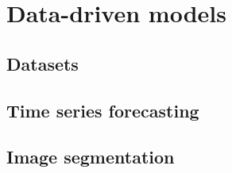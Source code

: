 
\section{\label{sec:Data-driven methods} Data-driven models}

\subsection{\label{sec:Datasets} Datasets}

\subsection{\label{sec:Time series forecasting} Time series forecasting}

\subsection{\label{sec:Image segmentation} Image segmentation}